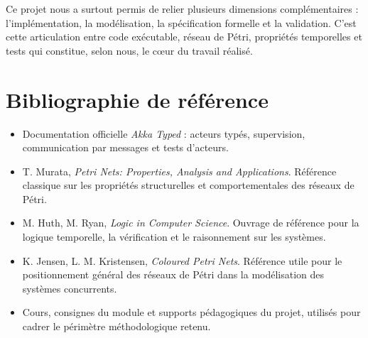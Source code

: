 \documentclass[11pt,a4paper]{article}
\begin{document}
Ce projet nous a surtout permis de relier plusieurs dimensions complémentaires : l'implémentation, la modélisation, la spécification formelle et la validation. C'est cette articulation entre code exécutable, réseau de Pétri, propriétés temporelles et tests qui constitue, selon nous, le cœur du travail réalisé.

\section*{Bibliographie de référence}

\begin{itemize}
    \item Documentation officielle \emph{Akka Typed} : acteurs typés, supervision, communication par messages et tests d'acteurs.
    \item T. Murata, \emph{Petri Nets: Properties, Analysis and Applications}. Référence classique sur les propriétés structurelles et comportementales des réseaux de Pétri.
    \item M. Huth, M. Ryan, \emph{Logic in Computer Science}. Ouvrage de référence pour la logique temporelle, la vérification et le raisonnement sur les systèmes.
    \item K. Jensen, L. M. Kristensen, \emph{Coloured Petri Nets}. Référence utile pour le positionnement général des réseaux de Pétri dans la modélisation des systèmes concurrents.
    \item Cours, consignes du module et supports pédagogiques du projet, utilisés pour cadrer le périmètre méthodologique retenu.
\end{itemize}
\end{document}
